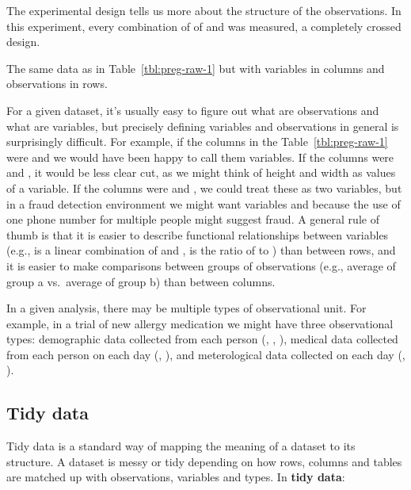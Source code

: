 \documentclass[article]{jss}
\begin{document}
The experimental design tells us more about the structure of the observations. In this experiment, every combination of of  and  was measured, a completely crossed design.

\begin{table}[htbp]
  \centering
  
  \caption{The same data as in Table~\ref{tbl:preg-raw-1} but with variables in columns and observations in rows.}
  \label{tbl:preg-tidy}
\end{table}

For a given dataset, it's usually easy to figure out what are observations and what are variables, but precisely defining variables and observations in general is surprisingly difficult. For example, if the columns in the Table~\ref{tbl:preg-raw-1} were  and  we would have been happy to call them variables. If the columns were  and , it would be less clear cut, as we might think of height and width as values of a  variable. If the columns were  and , we could treat these as two variables, but in a fraud detection environment we might want variables  and  because the use of one phone number for multiple people might suggest fraud. A general rule of thumb is that it is easier to describe functional relationships between variables (e.g.,  is a linear combination of  and ,  is the ratio of  to ) than between rows, and it is easier to make comparisons between groups of observations (e.g., average of group a vs.\ average of group b) than between columns.

In a given analysis, there may be multiple types of observational unit. For example, in a trial of new allergy medication we might have three observational types: demographic data collected from each person (, , ), medical data collected from each person on each day (, ), and meterological data collected on each day (, ).

\subsection{Tidy data}

Tidy data is a standard way of mapping the meaning of a dataset to its structure. A dataset is messy or tidy depending on how rows, columns and tables are matched up with observations, variables and types. In \textbf{tidy data}:
\end{document}
